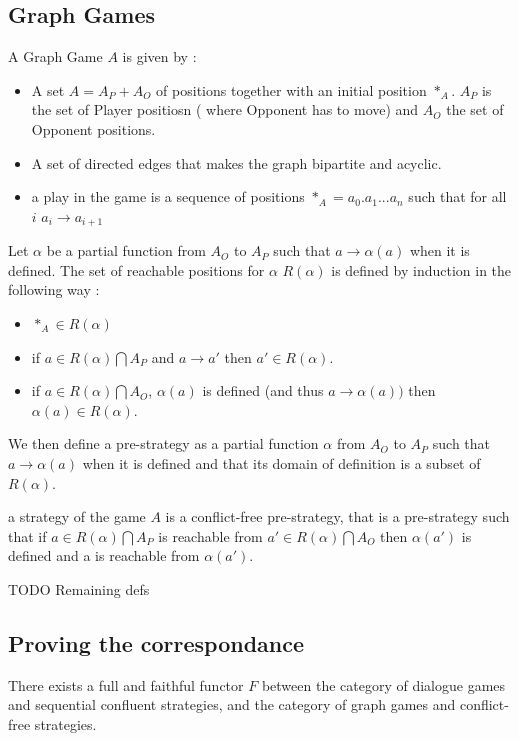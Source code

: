\documentclass[a4paper,UKenglish]{lipics}
\begin{document}
\subsection{Graph Games}
\begin{definition}
A Graph Game $A$ is given by :
\begin{itemize}
\item A set $A = A_P + A_O$ of positions together with an initial position $*_A$. $A_P$ is the set of Player positiosn ( where Opponent has to move) and $A_O$ the set of Opponent positions.
\item A set of directed edges that makes the graph bipartite and  acyclic.
\item a play in the game is a sequence of positions $*_A=a_0.a_1...a_n$ such that for all $i$ $a_i \rightarrow a_{i+1}$
\end{itemize}
\end{definition}

\begin{definition}
Let $\alpha$ be a partial function from $A_O$ to $A_P$ such that $a\rightarrow \alpha(a)$ when it is defined. The set of reachable positions for $\alpha$ $R(\alpha)$ is defined by induction in the following way : 
\begin{itemize}
\item $*_A \in R(\alpha)$
\item if $a \in R(\alpha)\bigcap A_P$ and $a\rightarrow a'$ then $a'\in R(\alpha)$. 
\item if $a \in R(\alpha)\bigcap A_O$, $\alpha(a)$ is defined (and thus $a\rightarrow \alpha(a)) $ then $\alpha(a)\in R(\alpha)$.
\end{itemize}
 
We then define a pre-strategy as a partial function $\alpha$ from $A_O$ to $A_P$ such that $a\rightarrow \alpha(a)$ when it is defined and that its domain of definition is a subset of $R(\alpha)$.
\end{definition}

\begin{definition}
a strategy of the game $A$ is a conflict-free pre-strategy, that is a pre-strategy such that if $a \in R(\alpha)\bigcap A_P$ is reachable from $a' \in R(\alpha)\bigcap A_O$ then $\alpha (a')$ is defined and a is reachable from $\alpha(a')$. 
\end{definition}
TODO Remaining defs
\subsection{Proving the correspondance}
\begin{theorem}
There exists a full and faithful functor $F$ between the category of dialogue games and sequential confluent strategies, and the category of graph games and conflict-free strategies.
\end{theorem} 
\end{document}

